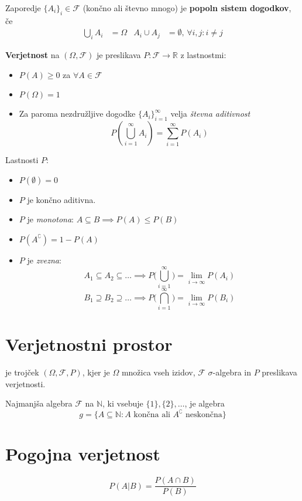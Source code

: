 \begin{multicols}{4}
Zaporedje $\{ A_i \}_i \in \mathcal{F}$ (končno ali števno mnogo) je \textbf{popoln sistem dogodkov}, če
\begin{align*}
	\bigcup_i A_i &= \Omega & A_i \cup A_j &= \emptyset, \, \forall i,j: i\neq j
\end{align*}


\textbf{Verjetnost} na $(\Omega, \mathcal{F})$ je preslikava $P: \mathcal{F} \to \mathbb{R}$ z lastnostmi:

\begin{itemize}
	\item $P(A) \geq 0$ za $\forall A \in \mathcal{F}$
	\item $P(\Omega) = 1$
	\item Za paroma nezdružljive dogodke $\{ A_i \}_{i=1}^\infty $ velja \textit{števna aditivnost}
	\[ P(\bigcup_{i=1}^\infty A_i) = \sum_{i=1}^\infty P(A_i)\]
\end{itemize}

Lastnosti $P$:
\begin{itemize}
	\item $P(\emptyset) = 0$
	\item $P$ je končno aditivna.
	\item $P$ je \textit{monotona}: $A \subseteq B \implies P(A) \leq P(B)$
	\item $P(A^\complement) = 1 - P(A)$
	\item $P$ je \textit{zvezna}:
	\[ A_1 \subseteq A_2 \subseteq \dots \implies P\big(\bigcup_{i=1}^\infty\big) = \lim_{i \to \infty} P(A_i)\]
	\[ B_1 \supseteq B_2 \supseteq \dots \implies P\big(\bigcap_{i=1}^\infty\big) = \lim_{i \to \infty} P(B_i)\]
\end{itemize}

\section{Verjetnostni prostor}
je trojček $(\Omega, \mathcal{F}, P)$, kjer je $\Omega$ množica vseh izidov, $\mathcal{F}$ $\sigma$-algebra in $P$ preslikava verjetnosti.


Najmanjša algebra $\mathcal{F}$ na $\mathbb{N}$, ki vsebuje $ \{1\}, \{2\}, \dots$, je algebra \[g = \{ A \subseteq \mathbb{N} : \text{$A$ končna ali $A^\complement$ neskončna} \} \]

\section{Pogojna verjetnost}
\[ P(A | B) = \frac{P(A \cap B)}{P(B)}\]


\end{multicols}

